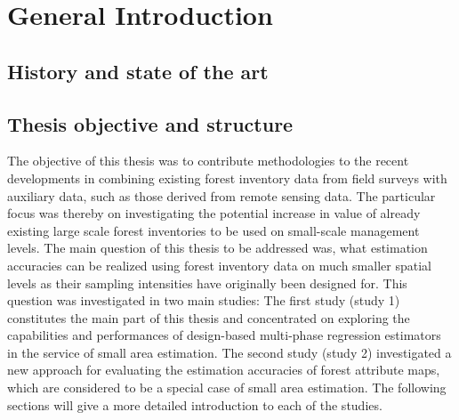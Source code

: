 	
			
	

	
\chapter{General Introduction}
\label{chap:intro}
\newpage

\section{History and state of the art}
\label{sec:intro:hist_soa}
\newpage



\section{Thesis objective and structure}
\label{sec:intro:obj_and_struct}

The objective of this thesis was to contribute methodologies to the recent developments in combining existing forest inventory data from field surveys with auxiliary data, such as those derived from remote sensing data. The particular focus was thereby on investigating the potential increase in value of already existing large scale forest inventories to be used on small-scale management levels. The main question of this thesis to be addressed was, what estimation accuracies can be realized using forest inventory data on much smaller spatial levels as their sampling intensities have originally been designed for. This question was investigated in two main studies: The first study (study 1) constitutes the main part of this thesis and concentrated on exploring the capabilities and performances of design-based multi-phase regression estimators in the service of small area estimation. The second study (study 2) investigated a new approach for evaluating the estimation accuracies of forest attribute maps, which are considered to be a special case of small area estimation. The following sections will give a more detailed introduction to each of the studies.

